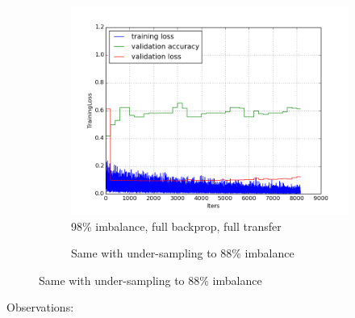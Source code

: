 \documentclass[a4paper,11pt]{article}
\begin{document}
\begin{figure}
    \centering
    \begin{minipage}[b]{\textwidth}
      \begin{subfigure}{.5\textwidth} 
        \centering
        \includegraphics[scale=0.4]{images/plot_clampdetCI98_none_bs128_lr4.png}
        \caption{98\% imbalance, full backprop, full transfer}\label{fig:2a}
      \end{subfigure}%
      \begin{subfigure}{.5\textwidth} 
        \centering
        \caption{Same with under-sampling to 88\% imbalance}\label{fig:2b}
      \end{subfigure} \par \vspace*{20pt} %
    \end{minipage}%
\end{figure}

Observations:
\end{document}
